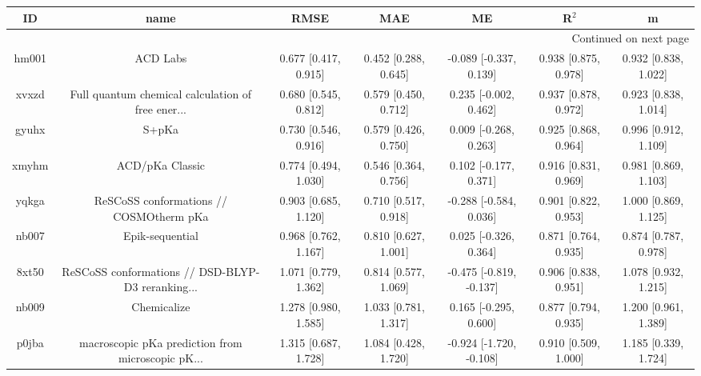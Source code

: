 \documentclass{article}
\begin{document}
\begin{center}
\begin{longtable}{|ccccccc|}
\toprule
    ID &                                               name &                    RMSE &                    MAE &                        ME &                 R$^2$ &                       m \\
\midrule
\endhead
\midrule
\multicolumn{7}{r}{{Continued on next page}} \\
\midrule
\endfoot

\bottomrule
\endlastfoot
 hm001 &                                           ACD Labs &    0.677 [0.417, 0.915] &   0.452 [0.288, 0.645] &    -0.089 [-0.337, 0.139] &  0.938 [0.875, 0.978] &    0.932 [0.838, 1.022] \\
 xvxzd &  Full quantum chemical calculation of free ener... &    0.680 [0.545, 0.812] &   0.579 [0.450, 0.712] &     0.235 [-0.002, 0.462] &  0.937 [0.878, 0.972] &    0.923 [0.838, 1.014] \\
 gyuhx &                                              S+pKa &    0.730 [0.546, 0.916] &   0.579 [0.426, 0.750] &     0.009 [-0.268, 0.263] &  0.925 [0.868, 0.964] &    0.996 [0.912, 1.109] \\
 xmyhm &                                    ACD/pKa Classic &    0.774 [0.494, 1.030] &   0.546 [0.364, 0.756] &     0.102 [-0.177, 0.371] &  0.916 [0.831, 0.969] &    0.981 [0.869, 1.103] \\
 yqkga &            ReSCoSS conformations // COSMOtherm pKa &    0.903 [0.685, 1.120] &   0.710 [0.517, 0.918] &    -0.288 [-0.584, 0.036] &  0.901 [0.822, 0.953] &    1.000 [0.869, 1.125] \\
 nb007 &                                    Epik-sequential &    0.968 [0.762, 1.167] &   0.810 [0.627, 1.001] &     0.025 [-0.326, 0.364] &  0.871 [0.764, 0.935] &    0.874 [0.787, 0.978] \\
 8xt50 &  ReSCoSS conformations // DSD-BLYP-D3 reranking... &    1.071 [0.779, 1.362] &   0.814 [0.577, 1.069] &   -0.475 [-0.819, -0.137] &  0.906 [0.838, 0.951] &    1.078 [0.932, 1.215] \\
 nb009 &                                        Chemicalize &    1.278 [0.980, 1.585] &   1.033 [0.781, 1.317] &     0.165 [-0.295, 0.600] &  0.877 [0.794, 0.935] &    1.200 [0.961, 1.389] \\
 p0jba &  macroscopic pKa prediction from microscopic pK... &    1.315 [0.687, 1.728] &   1.084 [0.428, 1.720] &   -0.924 [-1.720, -0.108] &  0.910 [0.509, 1.000] &    1.185 [0.339, 1.724] \\

\end{longtable}
\end{center}
\end{document}
